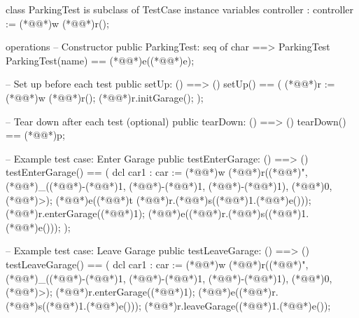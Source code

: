 \documentclass[a4paper]{article}
\begin{document}
\title{}
\author{}
\begin{vdm_al}
class ParkingTest is subclass of TestCase
instance variables
    controller : controller := (*@@*)w (*@@*)r();

operations
    -- Constructor
    public ParkingTest: seq of char ==> ParkingTest
    ParkingTest(name) == (*@@*)e((*@@*)e);

    -- Set up before each test
    public setUp: () ==> ()
    setUp() == 
    (
        (*@@*)r := (*@@*)w (*@@*)r();
        (*@@*)r.initGarage();
    );

    -- Tear down after each test (optional)
    public tearDown: () ==> ()
    tearDown() == (*@@*)p;

  
    -- Example test case: Enter Garage
    public testEnterGarage: () ==> ()
    testEnterGarage() ==
    (
        dcl car1 : car := (*@@*)w (*@@*)r((*@@*)", (*@@*)_((*@\vdmnotcovered{}@*)-(*@\vdmnotcovered{}@*)1, (*@\vdmnotcovered{}@*)-(*@\vdmnotcovered{}@*)1, (*@\vdmnotcovered{}@*)-(*@\vdmnotcovered{}@*)1), (*@\vdmnotcovered{}@*)0, (*@@*)>);
        (*@@*)e((*@@*)t (*@@*)r.(*@@*)s((*@@*)1.(*@@*)e()));
        (*@@*)r.enterGarage((*@@*)1);
        (*@@*)e((*@@*)r.(*@@*)s((*@@*)1.(*@@*)e()));
    );

    -- Example test case: Leave Garage
    public testLeaveGarage: () ==> ()
    testLeaveGarage() ==
    (
        dcl car1 : car := (*@@*)w (*@@*)r((*@@*)", (*@@*)_((*@\vdmnotcovered{}@*)-(*@\vdmnotcovered{}@*)1, (*@\vdmnotcovered{}@*)-(*@\vdmnotcovered{}@*)1, (*@\vdmnotcovered{}@*)-(*@\vdmnotcovered{}@*)1), (*@\vdmnotcovered{}@*)0, (*@@*)>);
        (*@@*)r.enterGarage((*@@*)1);
        (*@@*)e((*@@*)r.(*@@*)s((*@@*)1.(*@@*)e()));
        (*@@*)r.leaveGarage((*@@*)1.(*@@*)e());
        

\end{vdm_al}
\end{document}
